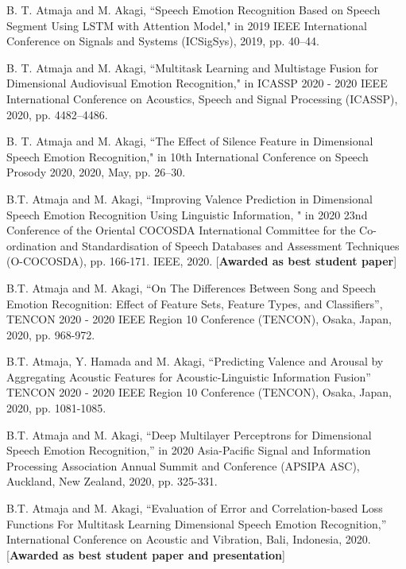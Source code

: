 \begin{publication}
\item
B. T. Atmaja and M. Akagi, ``Speech Emotion Recognition Based on Speech Segment
Using LSTM with Attention Model," in 2019 IEEE International Conference on
Signals and Systems (ICSigSys), 2019, pp. 40--44.

\item
B. T. Atmaja and M. Akagi, ``Multitask Learning and Multistage Fusion for Dimensional Audiovisual Emotion Recognition," in ICASSP 2020 - 2020 IEEE International Conference on Acoustics, Speech and Signal Processing (ICASSP), 2020, pp. 4482--4486.

\item
B. T. Atmaja and M. Akagi, ``The Effect of Silence Feature in Dimensional
Speech Emotion Recognition," in 10th International Conference on Speech Prosody
2020, 2020, May, pp. 26--30.

\item
B.T. Atmaja and M. Akagi, ``Improving Valence Prediction in
Dimensional Speech Emotion Recognition Using Linguistic Information, " in 2020
23nd Conference of the Oriental COCOSDA International Committee for the
Co-ordination and Standardisation of Speech Databases and Assessment Techniques
(O-COCOSDA), pp. 166-171. IEEE, 2020. [\textbf{Awarded as best student paper}]

\item
B.T. Atmaja and M. Akagi, ``On The Differences Between Song and Speech Emotion
Recognition: Effect of Feature Sets, Feature Types, and Classifiers'', TENCON
2020 - 2020 IEEE Region 10 Conference (TENCON), Osaka, Japan, 2020, pp. 968-972.

\item
B.T. Atmaja, Y. Hamada  and M. Akagi, ``Predicting Valence and Arousal by Aggregating Acoustic Features for Acoustic-Linguistic Information Fusion''
TENCON 2020 - 2020 IEEE Region 10 Conference (TENCON), Osaka, Japan, 2020, pp. 1081-1085. 

\item 
B.T. Atmaja and M. Akagi, ``Deep Multilayer Perceptrons for Dimensional Speech
Emotion Recognition,'' in 2020 Asia-Pacific Signal and Information Processing
Association Annual Summit and Conference (APSIPA ASC), Auckland, New Zealand,
2020, pp. 325-331.

\item 
B.T. Atmaja and M. Akagi, ``Evaluation of Error and Correlation-based Loss
Functions For Multitask Learning Dimensional Speech Emotion Recognition,''
International Conference on Acoustic and Vibration, Bali, Indonesia, 2020.
[\textbf{Awarded as best student paper and presentation}]\\


\end{publication}
